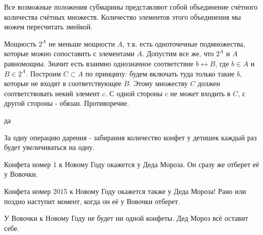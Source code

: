 \begin{solution}{1.22}
\begin{center}
\end{center}

Все возможные положения субмарины представляют собой объединение счётного количества счётных множеств. Количество элементов этого объединения мы можем пересчитать змейкой.
\end{solution}
\begin{solution}{1.23}
Мощность $2^{A}$ не меньше мощности $A$, т.к. есть одноточечные подмножества, которые можно сопоставить с элементами $A$. Допустим все же, что $2^{A}$ и $A$ равномощны. Значит есть взаимно однозначное соответствие $b\longleftrightarrow B$, где $b\in A$ и $B\in 2^{A}$. Построим $C\subset A$ по принципу: будем включать туда только такие $b$, которые не входят в соответствующее $B$. Этому множеству $C$ должен соответствовать некий элемент $c$. С одной стороны $c$ не может входить в $C$, с другой стороны - обязан. Противоречие.
\end{solution}
\begin{solution}{1.24}
да
\end{solution}
\begin{solution}{1.25}
За одну операцию дарения - забирания количество конфет у детишек каждый раз будет увеличиваться на одну.

Конфета номер 1 к Новому Году окажется у Деда Мороза. Он сразу же отберет её у Вовочки.

Конфета номер 2015 к Новому Году окажется также у Деда Мороза! Рано или поздно наступит момент, когда он её у Вовочки отберет.

У Вовочки к Новому Году не будет ни одной конфеты. Дед Мороз всё оставит себе.
\end{solution}
